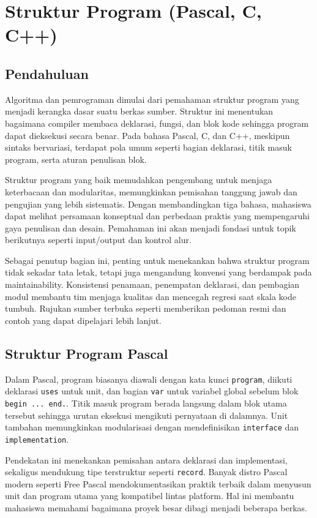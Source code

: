 \documentclass[../main.tex]{subfiles}
\begin{document}
\chapter{Struktur Program (Pascal, C, C++)}
\section{Pendahuluan}
Algoritma dan pemrograman dimulai dari pemahaman struktur program yang menjadi kerangka dasar suatu berkas sumber. Struktur ini menentukan bagaimana compiler membaca deklarasi, fungsi, dan blok kode sehingga program dapat dieksekusi secara benar. Pada bahasa Pascal, C, dan C++, meskipun sintaks bervariasi, terdapat pola umum seperti bagian deklarasi, titik masuk program, serta aturan penulisan blok.

Struktur program yang baik memudahkan pengembang untuk menjaga keterbacaan dan modularitas, memungkinkan pemisahan tanggung jawab dan pengujian yang lebih sistematis. Dengan membandingkan tiga bahasa, mahasiswa dapat melihat persamaan konseptual dan perbedaan praktis yang mempengaruhi gaya penulisan dan desain. Pemahaman ini akan menjadi fondasi untuk topik berikutnya seperti input/output dan kontrol alur.

Sebagai penutup bagian ini, penting untuk menekankan bahwa struktur program tidak sekadar tata letak, tetapi juga mengandung konvensi yang berdampak pada maintainability. Konsistensi penamaan, penempatan deklarasi, dan pembagian modul membantu tim menjaga kualitas dan mencegah regresi saat skala kode tumbuh. Rujukan sumber terbuka seperti \textcite{pascal-tutorial-wikibooks,gnu-c-manual,cpp-reference} memberikan pedoman resmi dan contoh yang dapat dipelajari lebih lanjut.

\section{Struktur Program Pascal}
Dalam Pascal, program biasanya diawali dengan kata kunci \texttt{program}, diikuti deklarasi \texttt{uses} untuk unit, dan bagian \texttt{var} untuk variabel global sebelum blok \texttt{begin ... end.}. Titik masuk program berada langsung dalam blok utama tersebut sehingga urutan eksekusi mengikuti pernyataan di dalamnya. Unit tambahan memungkinkan modularisasi dengan mendefinisikan \texttt{interface} dan \texttt{implementation}.

Pendekatan ini menekankan pemisahan antara deklarasi dan implementasi, sekaligus mendukung tipe terstruktur seperti \texttt{record}. Banyak distro Pascal modern seperti Free Pascal mendokumentasikan praktik terbaik dalam menyusun unit dan program utama yang kompatibel lintas platform. Hal ini membantu mahasiswa memahami bagaimana proyek besar dibagi menjadi beberapa berkas.
\end{document}
